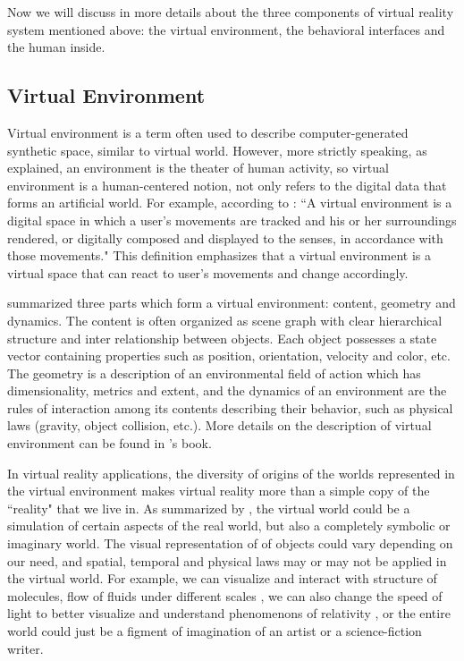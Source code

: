 Now we will discuss in more details about the three components of virtual reality system mentioned above: the virtual environment, the behavioral interfaces and the human inside.

\subsection{Virtual Environment}
Virtual environment is a term often used to describe computer-generated synthetic space, similar to virtual world. However, more strictly speaking, as \citet{Ellis1991VE} explained, an environment is the theater of human activity, so virtual environment is a human-centered notion, not only refers to the digital data that forms an artificial world. For example, according to \citet{Fox2009Guide}: ``A virtual environment is a digital space in which a user's movements are tracked and his or her surroundings rendered, or digitally composed and displayed to the senses, in accordance with those movements." This definition emphasizes that a virtual environment is a virtual space that can react to user's movements and change accordingly.

\citet{Ellis1991VE} summarized three parts which form a virtual environment: content, geometry and dynamics. The content is often organized as scene graph with clear hierarchical structure and inter relationship between objects. Each object possesses a state vector containing properties such as position, orientation, velocity and color, etc. The geometry is a description of an environmental field of action which has dimensionality, metrics and extent, and the dynamics of an environment are the rules of interaction among its contents describing their behavior, such as physical laws (gravity, object collision, etc.). More details on the description of virtual environment can be found in \citet{Ellis1991Pictorial}'s book.

In virtual reality applications, the diversity of origins of the worlds represented in the virtual environment makes virtual reality more than a simple copy of the ``reality" that we live in. As summarized by \citet{Fuchs2011Book}, the virtual world could be a simulation of certain aspects of the real world, but also a completely symbolic or imaginary world. The visual representation of of objects could vary depending on our need, and spatial, temporal and physical laws may or may not be applied in the virtual world. For example, we can visualize and interact with structure of molecules, flow of fluids under different scales \citep{Ferey2009Multisensory, Bryson1996Virtual}, we can also change the speed of light to better visualize and understand phenomenons of relativity \citep{Doat2011NRP}, or the entire world could just be a figment of imagination of an artist or a science-fiction writer.



